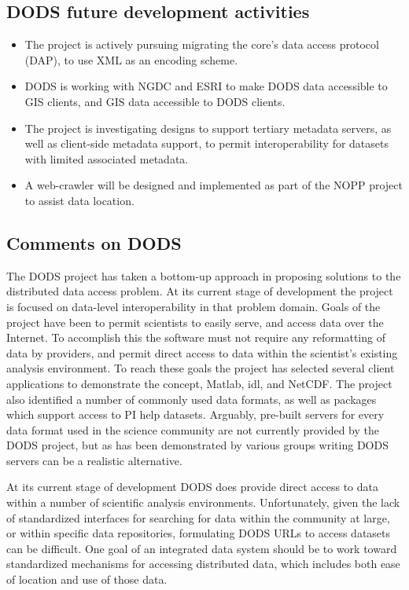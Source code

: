\subsection{DODS future development activities}

\begin{itemize}
\item The project is actively pursuing migrating the core's data access protocol (DAP), to use XML 
as an encoding scheme.
\item DODS is working with NGDC and ESRI to make DODS data accessible to GIS clients, and 
GIS data accessible to DODS clients.
\item The project is investigating designs to support tertiary metadata servers, as well as client-side 
metadata support, to permit interoperability for datasets with limited associated metadata.
\item A web-crawler will be designed and implemented as part of the NOPP project to assist data 
location.
\end{itemize}

\subsection{Comments on DODS}

The DODS project has taken a bottom-up approach in proposing solutions to the distributed data 
access problem. At its current stage of development the project is focused on data-level 
interoperability in that problem domain. Goals of the project have been to permit scientists to 
easily serve, and access data over the Internet. To accomplish this the software must not require 
any reformatting of data by providers, and permit direct access to data within the scientist's 
existing analysis environment. To reach these goals the project has selected several client 
applications to demonstrate the concept, Matlab, idl, and NetCDF. The project also identified a 
number of commonly used data formats, as well as packages which support access to PI help 
datasets. Arguably, pre-built servers for every data format used in the science community are not 
currently provided by the DODS project, but as has been demonstrated by various groups writing 
DODS servers can be a realistic alternative.

At its current stage of development DODS does provide direct access to data within a number of 
scientific analysis environments. Unfortunately, given the lack of standardized interfaces for 
searching for data within the community at large, or within specific data repositories, 
formulating DODS URLs to access datasets can be difficult. One goal of an integrated data 
system should be to work toward standardized mechanisms for accessing distributed data, which 
includes both ease of location and use of those data.

